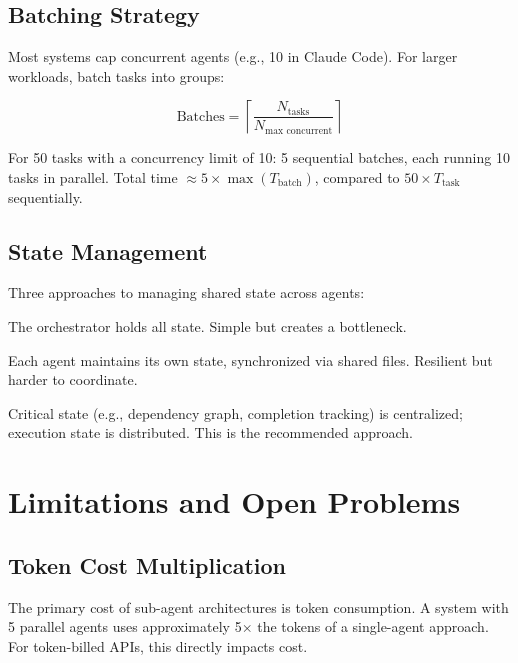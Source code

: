 \documentclass[11pt,letterpaper,twocolumn]{article}
\begin{document}
\subsection{Batching Strategy}

Most systems cap concurrent agents (e.g., 10 in Claude Code).  For larger
workloads, batch tasks into groups:

\[
  \text{Batches} = \left\lceil \frac{N_{\text{tasks}}}{N_{\text{max concurrent}}} \right\rceil
\]

For 50 tasks with a concurrency limit of 10: 5 sequential batches, each
running 10 tasks in parallel.  Total time $\approx 5 \times
\max(T_{\text{batch}})$, compared to $50 \times T_{\text{task}}$
sequentially.

\subsection{State Management}

Three approaches to managing shared state across agents:

\begin{description}[leftmargin=0pt,itemsep=2pt]
  \item[Centralized.] The orchestrator holds all state.  Simple but creates
    a bottleneck.
  \item[Distributed.] Each agent maintains its own state, synchronized via
    shared files.  Resilient but harder to coordinate.
  \item[Hybrid.] Critical state (e.g., dependency graph, completion
    tracking) is centralized; execution state is distributed.  This is the
    recommended approach.
\end{description}

\section{Limitations and Open Problems}
\label{sec:limits}

\subsection{Token Cost Multiplication}

The primary cost of sub-agent architectures is token consumption.  A system
with 5 parallel agents uses approximately 5$\times$ the tokens of a
single-agent approach.  For token-billed APIs, this directly impacts cost.
\end{document}
